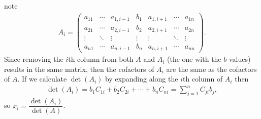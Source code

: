 \documentclass[letterpaper,10pt,english]{jupyterBook}
\begin{document}
\begin{sphinxadmonition}{note}
\begin{equation*}
\begin{split} A_i = \begin{pmatrix}
        a_{11} & \cdots & a_{1,i-1} & b_1 & a_{1,i+1} & \cdots & a_{1n} \\
        a_{21} & \cdots & a_{2,i-1} & b_2 & a_{2,i+1} & \cdots & a_{2n} \\
        \vdots & \ddots & \vdots & \vdots & \vdots & \ddots & \vdots \\
        a_{n1} & \cdots & a_{n,i-1} & b_n & a_{n,i+1} & \cdots & a_{nn}
    \end{pmatrix}. \end{split}
\end{equation*}
\sphinxAtStartPar
Since removing the \(i\)th column from both \(A\) and \(A_i\) (the one with the \(b\) values) results in the same matrix, then the cofactors of \(A_i\) are the same as the cofactors of \(A\). If we calculate \(\det(A_i)\) by expanding along the \(i\)th column of \(A_i\) then
\begin{equation*}
\begin{split} \det(A_i) = b_1 C_{1i} + b_2 C_{2i} + \cdots + b_n C_{ni} = \sum_{j=1}^n C_{ji} b_j, \end{split}
\end{equation*}
\sphinxAtStartPar
so \(x_i = \dfrac{\det(A_i)}{\det(A)}\).
\end{sphinxadmonition}
\end{document}
